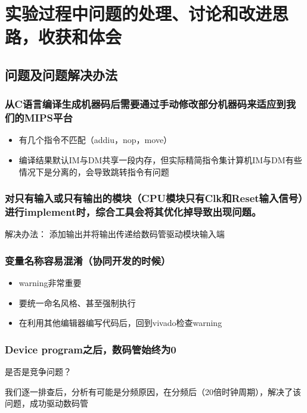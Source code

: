 \documentclass[UTF8]{article}
\begin{document}
\section{实验过程中问题的处理、讨论和改进思路，收获和体会}
\subsection{问题及问题解决办法}

\subsubsection{从C语言编译生成机器码后需要通过手动修改部分机器码来适应到我们的MIPS平台}
\begin{itemize}
    \item 有几个指令不匹配（addiu，nop，move）
    \item 编译结果默认IM与DM共享一段内存，但实际精简指令集计算机IM与DM有些情况下是分离的，会导致跳转指令有问题
\end{itemize}

\subsubsection{对只有输入或只有输出的模块（CPU模块只有Clk和Reset输入信号）进行implement时，综合工具会将其优化掉导致出现问题。}
      
解决办法：
添加输出并将输出传递给数码管驱动模块输入端

  
\subsubsection{变量名称容易混淆（协同开发的时候）}

\begin{itemize}
    \item warning非常重要
\item 要统一命名风格、甚至强制执行
\item 在利用其他编辑器编写代码后，回到vivado检查warning
  
\end{itemize}


\subsubsection{Device program之后，数码管始终为0}

是否是竞争问题？

我们逐一排查后，分析有可能是分频原因，在分频后（20倍时钟周期），解决了该问题，成功驱动数码管
\end{document}
